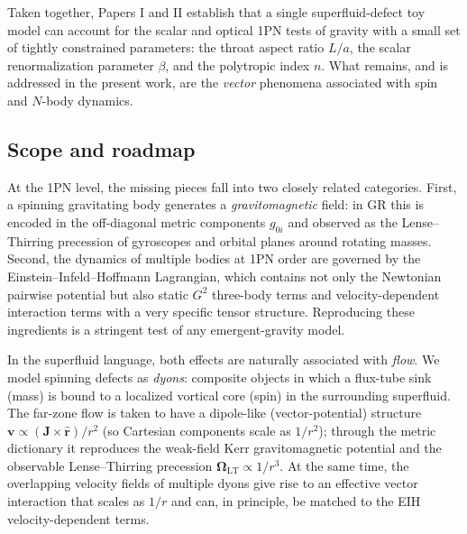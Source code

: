 \documentclass[11pt]{article}
\begin{document}
Taken together, Papers I and II establish that a single superfluid-defect toy
model can account for the scalar and optical 1PN tests of gravity with a small
set of tightly constrained parameters: the throat aspect ratio $L/a$, the scalar
renormalization parameter $\beta$, and the polytropic index $n$.
What remains, and is addressed in the present work, are the \emph{vector}
phenomena associated with spin and $N$-body dynamics.

\subsection{Scope and roadmap}
\label{subsec:intro-roadmap}

At the 1PN level, the missing pieces fall into two closely related categories.
First, a spinning gravitating body generates a \emph{gravitomagnetic} field:
in GR this is encoded in the off-diagonal metric components $g_{0i}$ and
observed as the Lense--Thirring precession of gyroscopes and orbital planes
around rotating masses.
Second, the dynamics of multiple bodies at 1PN order are governed by the
Einstein--Infeld--Hoffmann Lagrangian, which contains not only the Newtonian
pairwise potential but also static $G^2$ three-body terms and velocity-dependent
interaction terms with a very specific tensor structure.
Reproducing these ingredients is a stringent test of any emergent-gravity model.

In the superfluid language, both effects are naturally associated with
\emph{flow}.
We model spinning defects as \emph{dyons}: composite objects in which a
flux-tube sink (mass) is bound to a localized vortical core (spin) in the surrounding
superfluid.
The far-zone flow is taken to have a dipole-like (vector-potential) structure
$\mathbf{v}\propto (\mathbf{J}\times\hat{\mathbf{r}})/r^2$ (so Cartesian components scale as
$1/r^2$); through the metric dictionary it
reproduces the weak-field Kerr gravitomagnetic potential and the observable
Lense--Thirring precession $\bm{\Omega}_{\text{LT}}\propto 1/r^3$.
At the same time, the overlapping velocity fields of multiple dyons give rise
to an effective vector interaction that scales as $1/r$ and can, in principle,
be matched to the EIH velocity-dependent terms.
\end{document}
